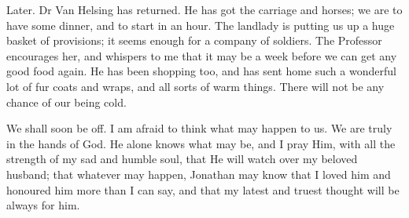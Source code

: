  

\begin{diary}{Later.}
Dr Van Helsing has returned. He has got the carriage and horses; we are to have some dinner, and to start in an hour. The landlady is putting us up a huge basket of provisions; it seems enough for a company of soldiers. The Professor encourages her, and whispers to me that it may be a week before we can get any good food again. He has been shopping too, and has sent home such a wonderful lot of fur coats and wraps, and all sorts of warm things. There will not be any chance of our being cold.

\divider

We shall soon be off. I am afraid to think what may happen to us. We are truly in the hands of God. He alone knows what may be, and I pray Him, with all the strength of my sad and humble soul, that He will watch over my beloved husband; that whatever may happen, Jonathan may know that I loved him and honoured him more than I can say, and that my latest and truest thought will be always for him.
\end{diary}
